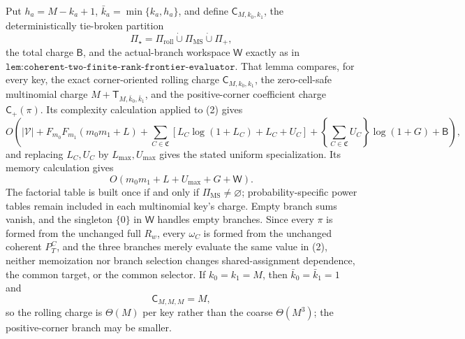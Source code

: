 Put \(h_a=M-k_a+1\), \(\bar k_a=\min\{k_a,h_a\}\), and define \(\mathsf C_{M,k_0,k_1}\), the deterministically tie-broken partition
\[
\Pi_\star
 =\Pi_{\mathrm{roll}}\mathbin{\dot\cup}\Pi_{\mathrm{MS}}\mathbin{\dot\cup}\Pi_+,
\]
the total charge \(\mathsf B\), and the actual-branch workspace \(\mathsf W\) exactly as in \(\texttt{lem:coherent-two-finite-rank-frontier-evaluator}\). That lemma compares, for every key, the exact corner-oriented rolling charge \(\mathsf C_{M,k_0,k_1}\), the zero-cell-safe multinomial charge \(M+\mathsf T_{M,\bar k_0,\bar k_1}\), and the positive-corner coefficient charge \(\mathsf C_+(\pi)\). Its complexity calculation applied to (2) gives
\[
O\!\left(
|\mathcal V|+F_{m_0}F_{m_1}(m_0m_1+L)
+\sum_{C\in\mathfrak C}\!\left[L_C\log(1+L_C)+L_C+U_C\right]
+\left\{\sum_{C\in\mathfrak C}U_C\right\}\log(1+G)+\mathsf B
\right),
\tag{4}
\]
and replacing \(L_C,U_C\) by \(L_{\max},U_{\max}\) gives the stated uniform specialization. Its memory calculation gives
\[
O(m_0m_1+L+U_{\max}+G+\mathsf W).
\tag{5}
\]
The factorial table is built once if and only if \(\Pi_{\mathrm{MS}}\ne\varnothing\); probability-specific power tables remain included in each multinomial key's charge. Empty branch sums vanish, and the singleton \(\{0\}\) in \(\mathsf W\) handles empty branches. Since every \(\pi\) is formed from the unchanged full \(R_w\), every \(\omega_C\) is formed from the unchanged coherent \(P_T^C\), and the three branches merely evaluate the same value in (2), neither memoization nor branch selection changes shared-assignment dependence, the common target, or the common selector. If \(k_0=k_1=M\), then \(\bar k_0=\bar k_1=1\) and
\[
\mathsf C_{M,M,M}=M,
\]
so the rolling charge is \(\Theta(M)\) per key rather than the coarse \(\Theta(M^3)\); the positive-corner branch may be smaller.

